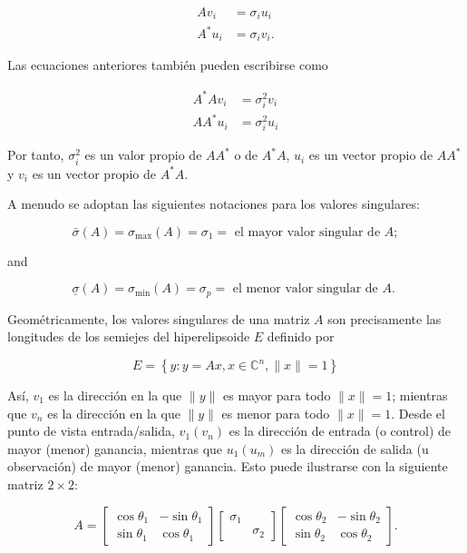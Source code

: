 $$
\begin{aligned}
A v_{i} & =\sigma_{i} u_{i} \\
A^{*} u_{i} & =\sigma_{i} v_{i} .
\end{aligned}
$$

Las ecuaciones anteriores también pueden escribirse como

$$
\begin{aligned}
A^{*} A v_{i} & =\sigma_{i}^{2} v_{i} \\
A A^{*} u_{i} & =\sigma_{i}^{2} u_{i}
\end{aligned}
$$

Por tanto, $\sigma_{i}^{2}$ es un valor propio de $A A^{*}$ o de $A^{*} A$, $u_{i}$ es un vector propio de $A A^{*}$ y $v_{i}$ es un vector propio de $A^{*} A$.

A menudo se adoptan las siguientes notaciones para los valores singulares:

$$
\bar{\sigma}(A)=\sigma_{\max }(A)=\sigma_{1}=\text { el mayor valor singular de } A ;
$$

and

$$
\underline{\sigma}(A)=\sigma_{\min }(A)=\sigma_{p}=\text { el menor valor singular de } A \text {. }
$$

Geométricamente, los valores singulares de una matriz $A$ son precisamente las longitudes de los semiejes del hiperelipsoide $E$ definido por

$$
E=\left\{y: y=A x, x \in \mathbb{C}^{n},\|x\|=1\right\}
$$

Así, $v_{1}$ es la dirección en la que $\|y\|$ es mayor para todo $\|x\|=1$; mientras que $v_{n}$ es la dirección en la que $\|y\|$ es menor para todo $\|x\|=1$. Desde el punto de vista entrada/salida, $v_{1}\left(v_{n}\right)$ es la dirección de entrada (o control) de mayor (menor) ganancia, mientras que $u_{1}\left(u_{m}\right)$ es la dirección de salida (u observación) de mayor (menor) ganancia. Esto puede ilustrarse con la siguiente matriz $2 \times 2$:

$$
A=\left[\begin{array}{cc}
\cos \theta_{1} & -\sin \theta_{1} \\
\sin \theta_{1} & \cos \theta_{1}
\end{array}\right]\left[\begin{array}{ll}
\sigma_{1} & \\
& \sigma_{2}
\end{array}\right]\left[\begin{array}{cc}
\cos \theta_{2} & -\sin \theta_{2} \\
\sin \theta_{2} & \cos \theta_{2}
\end{array}\right] .
$$

